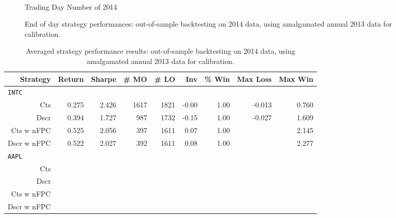 \begin{figure}
\centering
\begin{subfigure}{.45\linewidth}
  \centering
  \setlength\figureheight{\linewidth} 
  \setlength\figurewidth{\linewidth}
  
\end{subfigure}%
\hfill%
\begin{subfigure}{.45\linewidth}
  \centering
  \setlength\figureheight{\linewidth} 
  \setlength\figurewidth{\linewidth}
%   
\end{subfigure}\\

\leavevmode{}\hspace{0pt plus 1filll}\null

Trading Day Number of 2014

\vspace{1cm}
\begin{subfigure}{\linewidth}
  \setlength\figureheight{\linewidth} 
  \setlength\figurewidth{\linewidth}
  \resizebox{\linewidth}{!}{}
\end{subfigure}%
  \caption{End of day strategy performances: out-of-sample backtesting on 2014 data, using amalgamated annual 2013 data for calibration.}
  \label{fig:OOS_annual_comp}
\end{figure}

\begin{table}
\centering
{}
\begin{tabular}{@{} *{9}{r} @{}}
\toprule
Strategy & Return & Sharpe & \# MO & \# LO & Inv & \% Win & Max Loss & Max Win \\
\midrule
\multicolumn{9}{l}{\texttt{INTC}} \\ 
Cts & 0.275 & 2.426 & 1617 & 1821 & -0.00 & 1.00 & -0.013 & 0.760 \\ 
Dscr & 0.394 & 1.727 & 987 & 1732 & -0.15 & 1.00 & -0.027 & 1.609 \\ 
Cts w nFPC & 0.525 & 2.056 & 397 & 1611 & 0.07 & 1.00 &  & 2.145 \\ 
Dscr w nFPC & 0.522 & 2.027 & 392 & 1611 & 0.08 & 1.00 &  & 2.277 \\ [2ex]
\multicolumn{9}{l}{\texttt{AAPL}} \\ 
Cts \\
Dscr \\
Cts w nFPC \\
Dscr w nFPC\\
\bottomrule
\end{tabular}
\caption{Averaged strategy performance results: out-of-sample backtesting on 2014 data, using amalgamated annual 2013 data for calibration.}
\label{tbl:OOS_annual}
\end{table}